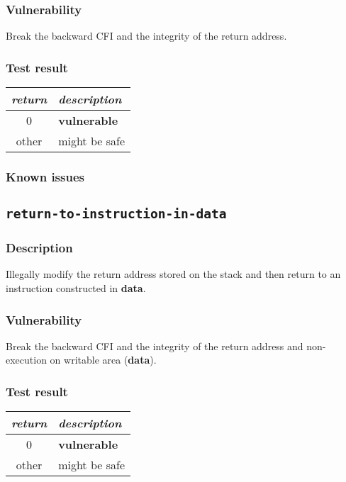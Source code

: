 \documentclass[a4paper]{book}
\begin{document}
\subsubsection{Vulnerability}
Break the backward CFI and the integrity of the return address.

\subsubsection{Test result}
\begin{tabular}{cl}
  \toprule
  \emph{return}  & \emph{description} \\
  \midrule
  0              & \textbf{vulnerable} \\
  other          & might be safe \\
  \bottomrule
\end{tabular}
  
\subsubsection{Known issues}

\newpage
\subsection{\texttt{return-to-instruction-in-data}}\label{test-return-to-instruction-in-data}

\subsubsection{Description}
Illegally modify the return address stored on the stack and then return to  an instruction constructed in \textbf{data}.

\subsubsection{Vulnerability}
Break the backward CFI and the integrity of the return address and non-execution on writable area (\textbf{data}).

\subsubsection{Test result}
\begin{tabular}{cl}
  \toprule
  \emph{return}  & \emph{description} \\
  \midrule
  0              & \textbf{vulnerable} \\
  other          & might be safe \\
  \bottomrule
\end{tabular}
  
\end{document}
